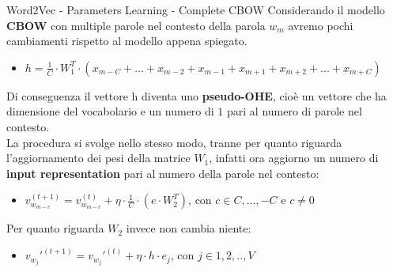 \documentclass[british]{beamer}
\begin{document}
\begin{frame}{Word2Vec - Parameters Learning - Complete CBOW}
	Considerando il modello \textbf{CBOW} con multiple parole nel contesto della parola \(w_{m}\) avremo pochi cambiamenti rispetto al modello appena spiegato.
	\begin{itemize}
		\item \( h = \frac{1}{C} \cdot W_1^T \cdot \left(x_{m-C} + ... + x_{m-2} + x_{m-1} + x_{m+1} + x_{m+2} + ... + x_{m+C} \right)\)
	\end{itemize}
	Di conseguenza il vettore h diventa uno \textbf{pseudo-OHE}, cio\`{e} un vettore che ha dimensione del vocabolario e un numero di \(1\) pari al numero di parole nel contesto.\\
	La procedura si svolge nello stesso modo, tranne per quanto riguarda l'aggiornamento dei pesi della matrice \(W_1\), infatti ora aggiorno un numero di \textbf{input representation} pari al numero della parole nel contesto:
	\begin{itemize}
		\item \( v_{w_{m-c}}^{(t+1)} = v_{w_{m-c}}^{(t)} + \eta\cdot \frac{1}{C} \cdot \left(e \cdot W_{2}^T\right)\), con \(c \in {C,...,-C} \) e \(c \neq 0\)
	\end{itemize}	
	Per quanto riguarda \(W_2\) invece non cambia niente:
	\begin{itemize}
		\item \( v_{w_{j}}'^{(t+1)} = v_{w_{j}}'^{(t)} + \eta\cdot h \cdot e_j\), con \(j \in {1,2,..,V}\)
	\end{itemize}
\end{frame}
\end{document}
